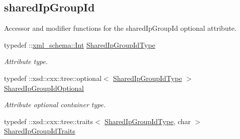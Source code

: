\subsection*{sharedIpGroupId}
\label{_amgrp50120c3695e630a4da9e7461805f1e4d}
Accessor and modifier functions for the sharedIpGroupId optional attribute. \begin{DoxyCompactItemize}
\item 
\hypertarget{classopenstack_1_1xml_1_1Server_afaf21469710f4df6287cde3cce6f0693}{
typedef ::\hyperlink{namespacexml__schema_a12d975a13061c938969b2b5143e97645}{xml\_\-schema::Int} \hyperlink{classopenstack_1_1xml_1_1Server_afaf21469710f4df6287cde3cce6f0693}{SharedIpGroupIdType}}
\label{classopenstack_1_1xml_1_1Server_afaf21469710f4df6287cde3cce6f0693}

\begin{DoxyCompactList}\small\item\em Attribute type. \item\end{DoxyCompactList}\item 
\hypertarget{classopenstack_1_1xml_1_1Server_a3c7e119808138b2e2bdaa2a63af0a982}{
typedef ::xsd::cxx::tree::optional$<$ \hyperlink{classopenstack_1_1xml_1_1Server_afaf21469710f4df6287cde3cce6f0693}{SharedIpGroupIdType} $>$ \hyperlink{classopenstack_1_1xml_1_1Server_a3c7e119808138b2e2bdaa2a63af0a982}{SharedIpGroupIdOptional}}
\label{classopenstack_1_1xml_1_1Server_a3c7e119808138b2e2bdaa2a63af0a982}

\begin{DoxyCompactList}\small\item\em Attribute optional container type. \item\end{DoxyCompactList}\item 
\hypertarget{classopenstack_1_1xml_1_1Server_a738a27af6ab596177f13457c092fa557}{
typedef ::xsd::cxx::tree::traits$<$ \hyperlink{classopenstack_1_1xml_1_1Server_afaf21469710f4df6287cde3cce6f0693}{SharedIpGroupIdType}, char $>$ \hyperlink{classopenstack_1_1xml_1_1Server_a738a27af6ab596177f13457c092fa557}{SharedIpGroupIdTraits}}
\label{classopenstack_1_1xml_1_1Server_a738a27af6ab596177f13457c092fa557}


\end{DoxyCompactItemize}
